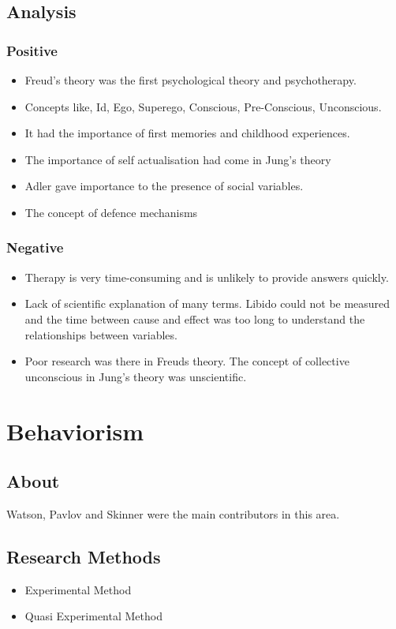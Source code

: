 \documentclass{article}
\begin{document}
		\subsection{Analysis}
			\subsubsection{Positive}
				\begin{itemize}
					\item Freud's theory was the first psychological theory and psychotherapy.
					\item Concepts like, Id, Ego, Superego, Conscious, Pre-Conscious, Unconscious.
					\item It had the importance of first memories and childhood experiences.
					\item The importance of self actualisation had come in Jung's theory
					\item Adler gave importance to the presence of social variables.
					\item The concept of defence mechanisms 
				\end{itemize}
			\subsubsection{Negative}
				\begin{itemize}
					\item Therapy is very time-consuming and is unlikely to provide answers quickly.
					\item Lack of scientific explanation of many terms. Libido could not be measured and the time between cause and effect was too long to understand the relationships between variables.
					\item Poor research was there in Freuds theory. The concept of collective unconscious in Jung's theory was unscientific.
				\end{itemize}

	\section{Behaviorism}
		\subsection{About}
			Watson, Pavlov and Skinner were the main contributors in this area.
		\subsection{Research Methods}
			\begin{itemize}
				\item Experimental Method
				\item Quasi Experimental Method
			\end{itemize}
\end{document}
